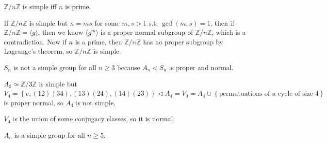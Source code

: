 \begin{eg}
    \(\mathbb{Z} / n \mathbb{Z} \) is simple iff \(n\) is prime.  
\end{eg}
\begin{explanation}
    If \(\mathbb{Z} / n \mathbb{Z} \) is simple but \(n = ms\) for some \(m, s > 1\) s.t. \(\gcd(m, s) = 1\), then if \(\mathbb{Z} / n \mathbb{Z} = \langle g \rangle \), then  we know \(\langle g^m \rangle \) is a proper normal subgroup of \(\mathbb{Z} / n \mathbb{Z} \), which is a contradiction. Now if \(n\) is a prime, then \(\mathbb{Z} / n \mathbb{Z} \) has no proper subgroup by Lagrange's theorem, so \(\mathbb{Z} / n \mathbb{Z} \) is simple.          
\end{explanation}
\begin{eg}
    \(S_n\) is not a simple group for all \(n \ge 3\) because \(A_n \triangleleft S_n\) is proper and normal.   
\end{eg}

\begin{eg}
    \(A_3 \simeq \mathbb{Z} / 3 \mathbb{Z} \) is simple but \(V_4 = \left\{ e, (12)(34), (13)(24), (14)(23) \right\}  \triangleleft A_4 = V_4 = A_4 \cup \left\{ \text{permutuations of a cycle of size }4  \right\} \) is proper normal, so \(A_4\) is not simple.   
\end{eg}
\begin{explanation}
    \(V_4\) is the union of some conjugacy classes, so it is normal. 
\end{explanation}

\begin{theorem}
    \(A_n\) is a simple group for all \(n \ge 5\).  
\end{theorem}